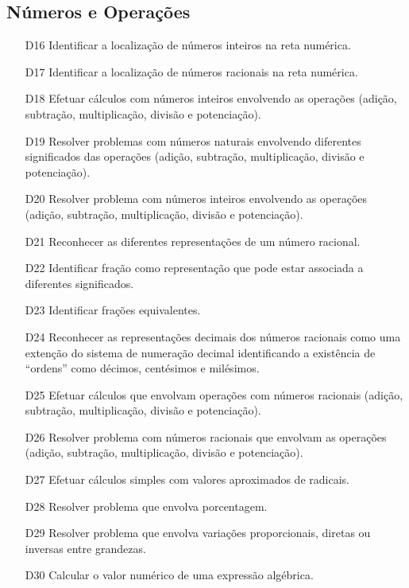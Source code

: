 \subsection{Números e Operações}
\begin{enumerate}
    \item[D16] \label{itm9:D16} Identificar a localização de números inteiros na reta numérica.
    \item[D17] \label{itm9:D17} Identificar a localização de números racionais na reta numérica.
    \item[D18] \label{itm9:D18} Efetuar cálculos com números inteiros envolvendo as operações (adição, subtração, multiplicação, divisão e potenciação).
    \item[D19] \label{itm9:D19} Resolver problemas com números naturais envolvendo diferentes significados das operações (adição, subtração, multiplicação, divisão e potenciação).
    \item[D20] \label{itm9:D20} Resolver problema com números inteiros envolvendo as operações (adição, subtração, multiplicação, divisão e potenciação).
    \item[D21] \label{itm9:D21} Reconhecer as diferentes representações de um número racional.
    \item[D22] \label{itm9:D22} Identificar fração como representação que pode estar associada a diferentes significados.
    \item[D23] \label{itm9:D23} Identificar frações equivalentes.
    \item[D24] \label{itm9:D24} Reconhecer as representações decimais dos números racionais como uma extenção do sistema de numeração decimal identificando a existência de ``ordens'' como décimos, centésimos e milésimos.
    \item[D25] \label{itm9:D25} Efetuar cálculos que envolvam operações com números racionais (adição, subtração, multiplicação, divisão e potenciação).
    \item[D26] \label{itm9:D26} Resolver problema com números racionais que envolvam as operações (adição, subtração, multiplicação, divisão e potenciação).
    \item[D27] \label{itm9:D27} Efetuar cálculos simples com valores aproximados de radicais.
    \item[D28] \label{itm9:D28} Resolver problema que envolva porcentagem.
    \item[D29] \label{itm9:D29} Resolver problema que envolva variações proporcionais, diretas ou inversas entre grandezas.
    \item[D30] \label{itm9:D30} Calcular o valor numérico de uma expressão algébrica.

\end{enumerate}
